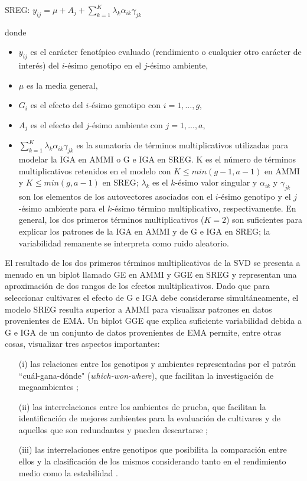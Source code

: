 \hspace{0.5cm} SREG: $y_{ij}= \mu + A_j + \sum_{k=1}^K \lambda_k \alpha_{ik} \gamma_{jk}$ 

donde 
\begin{itemize}
\item $y_{ij}$ es el carácter fenotípico evaluado (rendimiento o cualquier otro carácter de interés) del $i$-ésimo genotipo en el $j$-ésimo ambiente,
\item $\mu$ es la media general,
\item  $G_i$ es el efecto del $i$-ésimo genotipo con $i=1,...,g$,
\item $A_j$ es el efecto del $j$-ésimo ambiente con $j=1,...,a$,
\item $\sum_{k=1}^K \lambda_k \alpha_{ik} \gamma_{jk}$ es la sumatoria de términos multiplicativos utilizadas para modelar la IGA en AMMI o G e IGA en SREG. K es el número de términos multiplicativos retenidos en el modelo con $K \leq min(g-1,a-1)$ en AMMI y $K \leq min(g,a-1)$ en SREG; $\lambda_k$ es el $k$-ésimo valor singular y $\alpha_{ik}$ y $\gamma_{jk}$ son los elementos de los autovectores asociados con el $i$-ésimo genotipo y el $j$-ésimo ambiente para el $k$-ésimo término multiplicativo, respectivamente. En general, los dos primeros términos multiplicativos ($K=2$) son suficientes para explicar los patrones de la IGA en AMMI y de G e IGA en SREG; la variabilidad remanente se interpreta como ruido aleatorio. 
\end{itemize}


El resultado de los dos primeros términos multiplicativos de la SVD se presenta a menudo en un biplot llamado GE en AMMI y GGE en SREG y representan una aproximación de dos rangos de los efectos multiplicativos. Dado que para seleccionar cultivares el efecto de G e IGA debe considerarse simultáneamente, el modelo SREG resulta superior a AMMI para visualizar patrones en datos provenientes de EMA. Un biplot GGE que explica suficiente variabilidad debida a G e IGA de un conjunto de datos provenientes de EMA permite, entre otras cosas, visualizar tres aspectos importantes: 

\begin{itemize}
\item[(i)] las relaciones entre los genotipos y ambientes representadas por el patrón ``cuál-gana-dónde" (\emph{which-won-where}), que facilitan la investigación de megaambientes \citep{GauchZobel1997};

\item[(ii)] las interrelaciones entre los ambientes de prueba, que facilitan la identificación de mejores ambientes para la evaluación de cultivares \citep{Cooperetal1997} y de aquellos que son redundantes y pueden descartarse \citep{YanRajcan2002};

\item[(iii)] las interrelaciones entre genotipos que posibilita la comparación entre ellos y la clasificación de los mismos considerando tanto en el rendimiento medio como la estabilidad \citep{Yanetal2001}.
\end{itemize}

